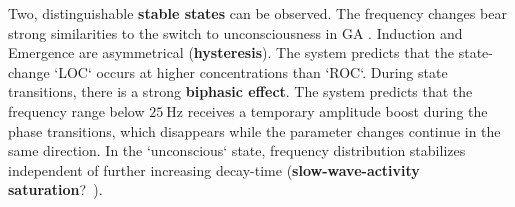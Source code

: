     Two, distinguishable \textbf{stable states} can be observed.
    The frequency changes bear strong similarities to the switch to unconsciousness in GA
    \cite{purdon_electroencephalogram_2013, ni_mhuircheartaigh_slow_wave_2013}.
    Induction and Emergence are asymmetrical (\textbf{hysteresis}).
    The system predicts that the state-change `LOC` occurs at higher concentrations than `ROC`.
    During state transitions, there is a strong \textbf{biphasic effect}.
    The system predicts that the frequency range below $\SI{25}{\hertz}$ receives a temporary amplitude boost during
    the phase transitions, which disappears while the parameter changes continue in the same direction.
    In the `unconscious` state, frequency distribution stabilizes independent of further increasing decay-time
    (\textbf{slow-wave-activity saturation}?~\cite{ni_mhuircheartaigh_slow_wave_2013}).

